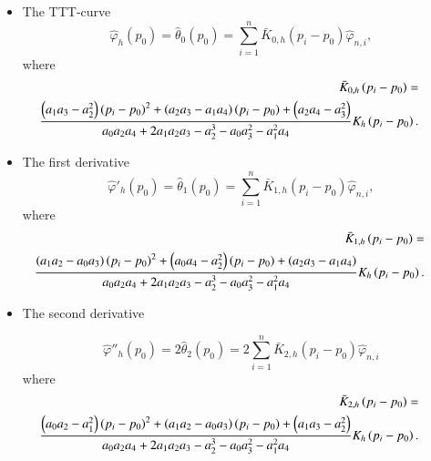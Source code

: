 \documentclass[preprint,12pt]{elsarticle}
\begin{document}
\begin{itemize}
\item { The TTT-curve}
\begin{equation}\label{theta0}
\widehat{\varphi}_{h}(p_0)= \widehat{\theta}_0(p_0)= \sum_{i=1}^n \bar{{K}}_{0,h}\left(p_i-p_0\right) \widehat{\varphi}_{n,i},
\end{equation}
where
\begin{eqnarray*}
\hskip-1cm &&\bar{{K}}_{0,h}\left(p_i-p_0\right)=\\
\hskip-1cm &&\frac{\left(a_1a_3-a_2^2\right)\left(p_i-p_0\right)^2+\left(a_2a_3-a_1a_4\right)\left(p_i-p_0\right)+\left(a_2a_4-a_3^2\right)}{a_0a_2a_4+2a_1a_2a_3-a_2^3-a_0a_3^2-a_1^2a_4} K_h\left(p_i-p_0\right).
\end{eqnarray*}

\item{The first derivative}
\begin{equation}\label{theta1}
\widehat{\varphi}'_{h}(p_0)=\widehat{\theta}_1(p_0)= \sum_{i=1}^n \bar{{K}}_{1,h}\left(p_i-p_0\right) \widehat{\varphi}_{n,i},
\end{equation}
where 
\begin{eqnarray*}
\hskip-1cm &&\bar{{K}}_{1,h}\left(p_i-p_0\right)= \\
\hskip-1cm &&\frac{\left(a_1a_2-a_0a_3\right)\left(p_i-p_0\right)^2+\left(a_0a_4-a_2^2\right)\left(p_i-p_0\right)+\left(a_2a_3-a_1a_4\right)}{a_0a_2a_4+2a_1a_2a_3-a_2^3-a_0a_3^2-a_1^2a_4} K_h\left(p_i-p_0\right).
\end{eqnarray*}

\item{ The second derivative }

\begin{equation}\label{theta2}
\widehat{\varphi}''_h(p_0)=2 \widehat{\theta}_2(p_0) =2 \sum_{i=1}^n \bar{{K}}_{2,h}\left(p_i-p_0\right) \widehat{\varphi}_{n,i}
\end{equation}
where 
\begin{eqnarray*}
\hskip-1cm &&\bar{{K}}_{2,h}\left(p_i-p_0\right)=\\
\hskip-1cm &&\frac{\left(a_0a_2-a_1^2\right)\left(p_i-p_0\right)^2+\left(a_1a_2-a_0a_3\right)\left(p_i-p_0\right)+\left(a_1a_3-a_2^2\right)}{a_0a_2a_4+2a_1a_2a_3-a_2^3-a_0a_3^2-a_1^2a_4} K_h\left(p_i-p_0\right).
\end{eqnarray*}
\end{itemize}

\end{document}
